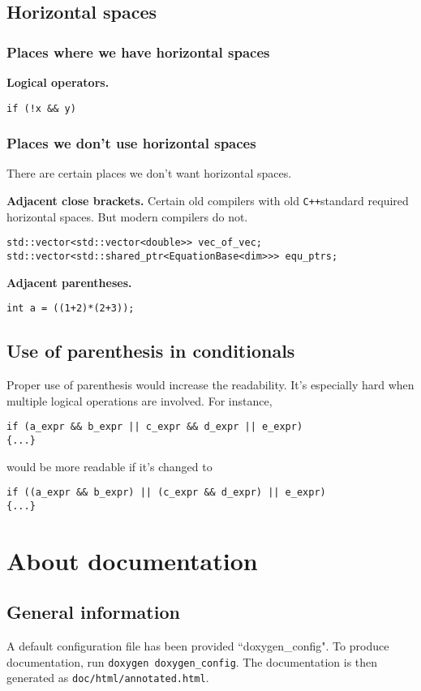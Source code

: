 \documentclass{article}
\newcommand{\cpp}{{\tt C++}}
\begin{document}
\subsection{Horizontal spaces}
\subsubsection{Places where we have horizontal spaces}
{\bf Logical operators.}
\begin{lstlisting}
if (!x && y)
\end{lstlisting}

\subsubsection{Places we don't use horizontal spaces}
There are certain places we don't want horizontal spaces. 

{\bf Adjacent close brackets.} Certain old compilers with old \cpp standard required horizontal spaces. But modern compilers do not.
\begin{lstlisting}
std::vector<std::vector<double>> vec_of_vec;
std::vector<std::shared_ptr<EquationBase<dim>>> equ_ptrs;
\end{lstlisting}

{\bf Adjacent parentheses.}
\begin{lstlisting}
int a = ((1+2)*(2+3));
\end{lstlisting}

\subsection{Use of parenthesis in conditionals}
Proper use of parenthesis would increase the readability. It's especially hard when multiple logical operations are involved. For instance,
\begin{lstlisting}
if (a_expr && b_expr || c_expr && d_expr || e_expr)
{...}
\end{lstlisting}
would be more readable if it's changed to
\begin{lstlisting}
if ((a_expr && b_expr) || (c_expr && d_expr) || e_expr)
{...}
\end{lstlisting}

\section{About documentation}
\subsection{General information}
A default configuration file has been provided ``doxygen\_config". To produce documentation, run {\tt doxygen doxygen\_config}. The documentation is then generated as {\tt doc/html/annotated.html}.
\end{document}
